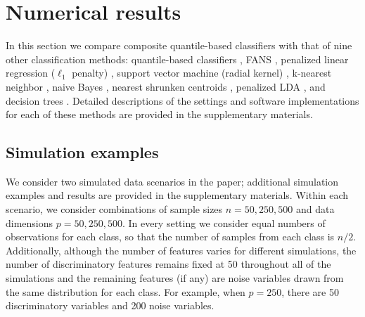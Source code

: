 

\section{Numerical results}
\label{sec:numerical-results}

In this section we compare composite quantile-based classifiers with that of
nine other classification methods: quantile-based classifiers \cite{hennig2016},
FANS \cite{fan2016}, penalized linear regression ($\ell_1$ penalty)
\cite{park2007}, support vector machine (radial kernel) \cite{cortes1995},
k-nearest neighbor \cite{cover1967}, naive Bayes \cite{hastie2009}, nearest
shrunken centroids \cite{tibshirani2002}, penalized LDA \cite{witten2011}, and
decision trees \cite{breiman1984}.  Detailed descriptions of the settings and
software implementations for each of these methods are provided in the
supplementary materials.


\subsection{Simulation examples}
\label{sec:simulated-data-scenarios}

We consider two simulated data scenarios in the paper; additional simulation
examples and results are provided in the supplementary materials.  Within each
scenario, we consider combinations of sample sizes $n = 50, 250, 500$ and data
dimensions $p = 50, 250, 500$.  In every setting we consider equal numbers of
observations for each class, so that the number of samples from each class is
$n / 2$.  Additionally, although the number of features varies for different
simulations, the number of discriminatory features remains fixed at 50
throughout all of the simulations and the remaining features (if any) are noise
variables drawn from the same distribution for each class.  For example, when
$p = 250$, there are 50 discriminatory variables and 200 noise variables.


